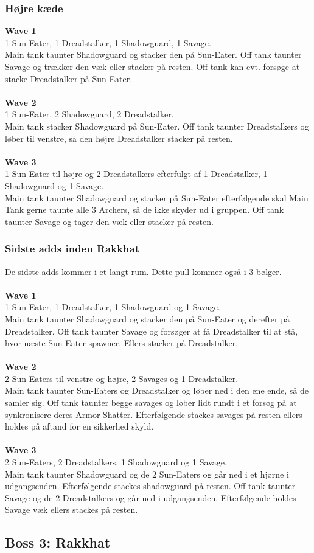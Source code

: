 \subsubsection*{Højre kæde}
\textbf{Wave 1}\\
1 Sun-Eater, 1 Dreadstalker, 1 Shadowguard, 1 Savage.\\
Main tank taunter Shadowguard og stacker den på Sun-Eater. Off tank taunter
Savage og trækker den væk eller stacker på resten. Off tank kan evt. forsøge at
stacke Dreadstalker på Sun-Eater.\\
\\
\textbf{Wave 2}\\
1 Sun-Eater, 2 Shadowguard, 2 Dreadstalker.\\
Main tank stacker Shadowguard på
Sun-Eater. Off tank taunter Dreadstalkers og løber til venstre, så den højre
Dreadstalker stacker på resten.\\
\\
\textbf{Wave 3}\\
1 Sun-Eater til højre og 2 Dreadstalkers efterfulgt af 1 Dreadstalker, 1 Shadowguard og 1
Savage.\\
Main tank taunter Shadowguard og stacker på Sun-Eater efterfølgende
skal Main Tank gerne taunte alle 3 Archers, så de ikke skyder ud i gruppen. 
Off tank taunter Savage og tager den væk eller stacker på resten.

\subsubsection*{Sidste adds inden Rakkhat}
De sidste adds kommer i et langt rum. Dette pull kommer også i 3 bølger.
\\\\
\textbf{Wave 1}\\
1 Sun-Eater, 1 Dreadstalker, 1 Shadowguard og 1 Savage. \\
Main tank taunter
Shadowguard og stacker den på Sun-Eater og derefter på Dreadstalker. Off tank
taunter Savage og forsøger at få Dreadstalker til at stå, hvor næste Sun-Eater
spawner. Ellers stacker på Dreadstalker.
\\\\
\textbf{Wave 2}\\
2 Sun-Eaters til venstre og højre, 2 Savages og 1 Dreadstalker.\\
Main tank
taunter Sun-Eaters og Dreadstalker og løber ned i den ene ende, så de samler
sig. Off tank taunter begge savages og løber lidt rundt i et forsøg på at
synkronisere deres Armor Shatter. Efterfølgende stackes savages på resten
ellers holdes på aftand for en sikkerhed skyld.
\\\\
\textbf{Wave 3}\\
2 Sun-Eaters, 2 Dreadstalkers, 1 Shadowguard og 1 Savage. \\
Main tank taunter
Shadowguard og de 2 Sun-Eaters og går ned i et hjørne i udgangsenden.
Efterfølgende stackes shadowguard på resten. Off tank
taunter Savage og de 2 Dreadstalkers og går ned i udgangsenden. Efterfølgende
holdes Savage væk ellers stackes på resten.

\subsection*{Boss 3: Rakkhat}

